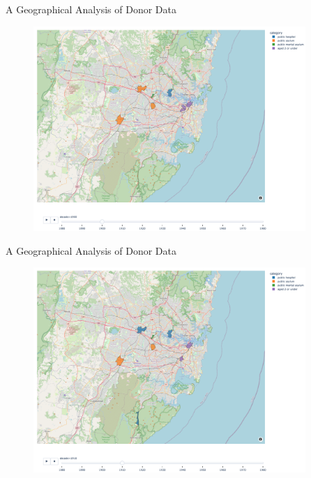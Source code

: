 \documentclass[]{beamer}
\begin{document}
\begin{frame}{A Geographical Analysis of Donor Data}
	\begin{figure}
		\includegraphics[width=0.92\textwidth]{img/choropleth_time/choropleth-3.png}
	\end{figure}
\end{frame}


\begin{frame}{A Geographical Analysis of Donor Data}
	\begin{figure}
		\includegraphics[width=0.92\textwidth]{img/choropleth_time/choropleth-4.png}
	\end{figure}
\end{frame}
\end{document}
